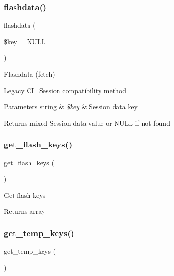 \subsubsection{\texorpdfstring{flashdata()}{flashdata()}}
{\footnotesize\ttfamily flashdata (\begin{DoxyParamCaption}\item[{}]{\$key = {\ttfamily NULL} }\end{DoxyParamCaption})}

Flashdata (fetch)

Legacy \mbox{\hyperlink{class_c_i___session}{C\+I\+\_\+\+Session}} compatibility method


\begin{DoxyParams}[1]{Parameters}
string & {\em \$key} & Session data key \\
\hline
\end{DoxyParams}
\begin{DoxyReturn}{Returns}
mixed Session data value or N\+U\+LL if not found 
\end{DoxyReturn}
\mbox{\label{class_c_i___session_a996e70387750cdc480712c1585743d8d}} 
\subsubsection{\texorpdfstring{get\+\_\+flash\+\_\+keys()}{get\_flash\_keys()}}
{\footnotesize\ttfamily get\+\_\+flash\+\_\+keys (\begin{DoxyParamCaption}{ }\end{DoxyParamCaption})}

Get flash keys

\begin{DoxyReturn}{Returns}
array 
\end{DoxyReturn}
\mbox{\label{class_c_i___session_a4fd9f48ff9bcf093778529cb7389eddb}} 
\subsubsection{\texorpdfstring{get\+\_\+temp\+\_\+keys()}{get\_temp\_keys()}}
{\footnotesize\ttfamily get\+\_\+temp\+\_\+keys (\begin{DoxyParamCaption}{ }\end{DoxyParamCaption})}

